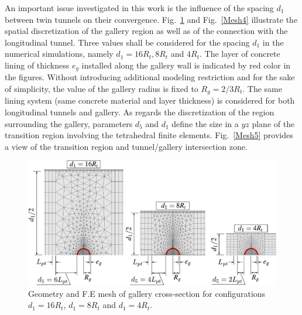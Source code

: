 \documentclass[Journal,letterpaper, NoLists,SectionNumbers]{ascelike-new}
\begin{document}
An important issue investigated in this work is the influence of the spacing $d_1$ between twin tunnels on their convergence. Fig.~\ref{Mesh3} and Fig.~\ref{Mesh4} illustrate the spatial discretization of the gallery region as well as of the connection with the longitudinal tunnel. Three values shall be considered for the spacing $d_1$ in the numerical simulations, namely  $d_1 = 16R_t, 8R_t$ and $4R_t$. The layer of concrete lining of thickness $e_g$ installed along the gallery wall is indicated by red color in the figures. Without introducing additional modeling restriction and for the sake of simplicity, the value of the gallery radius is fixed to $R_g = 2/3R_t$. The same lining system (same concrete material and layer thickness) is considered for both longitudinal tunnels and gallery. As regards the discretization of the region surrounding the gallery, parameters $d_5$ and $d_1$ define the size in a $yz$ plane of the transition region involving the tetrahedral finite elements. Fig.~\ref{Mesh5} provides a view of the transition region and tunnel/gallery intersection zone.
\begin{figure}[h!]
	\centering
	\includegraphics[scale=0.8]{Mesh3.pdf}
	\caption{Geometry and F.E mesh of gallery cross-section for configurations $d_1=16R_t$, $d_1=8R_t$ and $d_1=4R_t$.}
	\label{Mesh3}
\end{figure}
\end{document}
